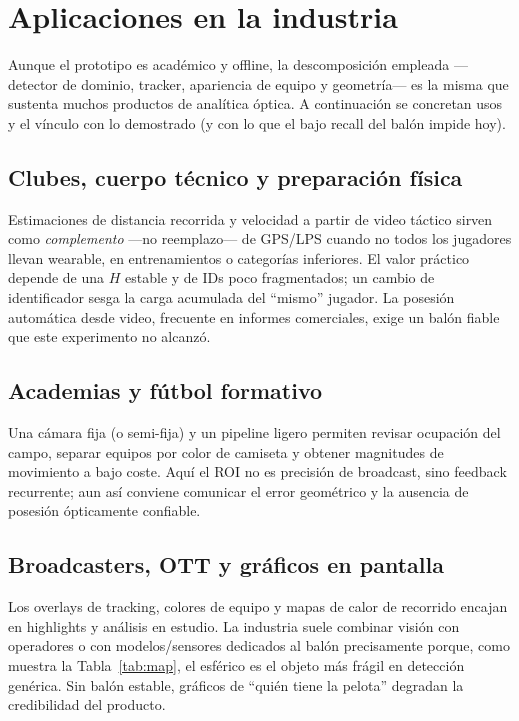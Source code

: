 \documentclass[conference]{IEEEtran}
\begin{document}
\section{Aplicaciones en la industria}
\label{sec:industria}

Aunque el prototipo es académico y offline, la descomposición empleada ---detector de dominio, tracker, apariencia de equipo y geometría--- es la misma que sustenta muchos productos de analítica óptica. A continuación se concretan usos y el vínculo con lo demostrado (y con lo que el bajo recall del balón impide hoy).

\subsection{Clubes, cuerpo técnico y preparación física}
Estimaciones de distancia recorrida y velocidad a partir de video táctico sirven como \emph{complemento} ---no reemplazo--- de GPS/LPS cuando no todos los jugadores llevan wearable, en entrenamientos o categorías inferiores. El valor práctico depende de una $H$ estable y de IDs poco fragmentados; un cambio de identificador sesga la carga acumulada del ``mismo'' jugador. La posesión automática desde video, frecuente en informes comerciales, exige un balón fiable que este experimento no alcanzó.

\subsection{Academias y fútbol formativo}
Una cámara fija (o semi-fija) y un pipeline ligero permiten revisar ocupación del campo, separar equipos por color de camiseta y obtener magnitudes de movimiento a bajo coste. Aquí el ROI no es precisión de broadcast, sino feedback recurrente; aun así conviene comunicar el error geométrico y la ausencia de posesión ópticamente confiable.

\subsection{Broadcasters, OTT y gráficos en pantalla}
Los overlays de tracking, colores de equipo y mapas de calor de recorrido encajan en highlights y análisis en estudio. La industria suele combinar visión con operadores o con modelos/sensores dedicados al balón precisamente porque, como muestra la Tabla~\ref{tab:map}, el esférico es el objeto más frágil en detección genérica. Sin balón estable, gráficos de ``quién tiene la pelota'' degradan la credibilidad del producto.
\end{document}
